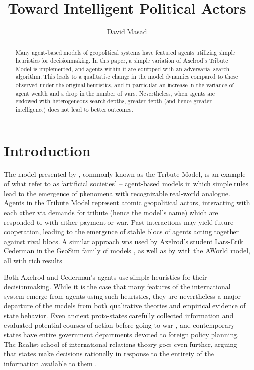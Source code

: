 \documentclass{article}
\begin{document}
\title{Toward Intelligent Political Actors}
	\author{David Masad}
	\maketitle

\begin{abstract}
Many  agent-based models of geopolitical systems have featured agents utilizing simple heuristics for decisionmaking. In this paper, a simple variation of Axelrod's Tribute Model is implemented, and agents within it are equipped with an adversarial search algorithm. This leads to a qualitative change in the model dynamics compared to those observed under the original heuristics, and in particular an increase in the variance of agent wealth and a drop in the number of wars. Nevertheless, when agents are endowed with heterogeneous search depths, greater depth (and hence greater intelligence) does not lead to better outcomes.
\end{abstract}

\onehalfspacing
\section{Introduction}
The model presented by \citet{axelrod_1997}, commonly known as the Tribute Model, is an example of what \citet{epstein_1996} refer to as `artificial societies' -- agent-based models in which simple rules lead to the emergence of phenomena with recognizable real-world analogue. Agents in the Tribute Model represent atomic geopolitical actors, interacting with each other via demands for tribute (hence the model's name) which are responded to with either payment or war. Past interactions may yield future cooperation, leading to the emergence of stable blocs of agents acting together against rival blocs. A similar approach was used by Axelrod's student Lars-Erik Cederman in the GeoSim family of models \citep{cederman_2003}, as well as by \citet{min_2002} with the AWorld model, all with rich results.

Both Axelrod and Cederman's agents use simple heuristics for their decisionmaking. While it is the case that many features of the international system emerge from agents using such heuristics, they are nevertheless a major departure of the models from both qualitative theories and empirical evidence of state behavior. Even ancient proto-states carefully collected information and evaluated potential courses of action before going to war \citep{sheldon_1989}, and contemporary states have entire government departments devoted to foreign policy planning. The Realist school of international relations theory goes even further, arguing that states make decisions rationally in response to the entirety of the information available to them \citep{waltz_2010}. 
\end{document}
